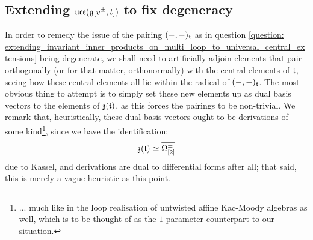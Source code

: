         \subsection{Extending \texorpdfstring{$ \mathfrak{uce}(\mathfrak{g}[v^{\pm}, t]) $}{} to fix degeneracy}
            \begin{remark} \label{remark: extending_underlying_vector_spaces_of_toroidal_lie_algebras}
                In order to remedy the issue of the pairing $(-, -)_{\mathfrak{t}}$ as in question \ref{question: extending_invariant_inner_products_on_multi_loop_to_universal_central_extensions} being degenerate, we shall need to artificially adjoin elements that pair orthogonally (or for that matter, orthonormally) with the central elements of $\mathfrak{t}$, seeing how these central elements all lie within the radical of $(-, -)_{\mathfrak{t}}$. The most obvious thing to attempt is to simply set these new elements up as dual basis vectors to the elements of $\mathfrak{z}(\mathfrak{t})$, as this forces the pairings to be non-trivial. We remark that, heuristically, these dual basis vectors ought to be derivations of some kind\footnote{... much like in the loop realisation of untwisted affine Kac-Moody algebras as well, which is to be thought of as the $1$-parameter counterpart to our situation.}, since we have the identification:
                    $$\mathfrak{z}(\mathfrak{t}) \simeq \overline{\Omega^{\pm}_{[2]}}$$
                due to Kassel, and derivations are dual to differential forms after all; that said, this is merely a vague heuristic as this point.


\end{remark}
